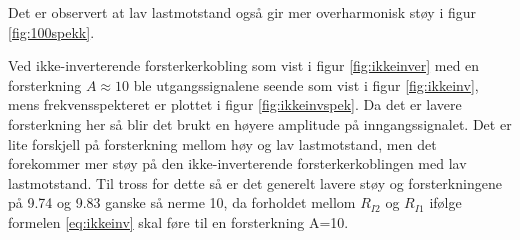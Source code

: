 Det er observert at lav lastmotstand også gir mer overharmonisk støy i figur \ref{fig:100spekk}.

Ved ikke-inverterende forsterkerkobling som vist i figur \ref{fig:ikkeinver} med en forsterkning $A \approx 10$ ble utgangssignalene seende som vist i figur \ref{fig:ikkeinv}, mens frekvensspekteret er plottet i figur \ref{fig:ikkeinvspek}. Da det er lavere forsterkning her så blir det brukt en høyere amplitude på inngangssignalet. Det er lite forskjell på forsterkning mellom høy og lav lastmotstand, men det forekommer mer støy på den ikke-inverterende forsterkerkoblingen med lav lastmotstand. Til tross for dette så er det generelt lavere støy og forsterkningene på 9.74 og 9.83 ganske så nerme 10, da forholdet mellom ${R_{I2}}$ og ${R_{I1}}$ ifølge formelen \ref{eq:ikkeinv} skal føre til en forsterkning A=10.


